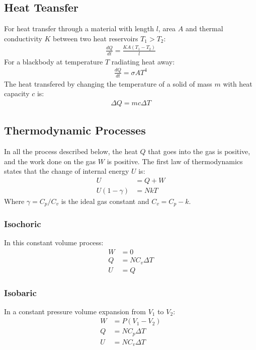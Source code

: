 \documentclass[11pt]{article}
\begin{document}
\begin{multicols*}{3}
\subsection{Heat Teansfer}
For heat transfer through a material with length $l$, area $A$ and thermal conductivity $K$ between two heat reservoirs $T_1 > T_2$:
\begin{align*}
  \frac{dQ}{dt} = \frac{KA (T_1 - T_2)}{l}
\end{align*}
For a blackbody at temperature $T$ radiating heat away:
\begin{align*}
  \frac{dQ}{dt} = \sigma A T^4
\end{align*}
The heat transfered by changing the temperature of a solid of mass $m$ with heat capacity $c$ is:
\begin{align*}
  \Delta Q = mc \Delta T
\end{align*}

\subsection{Thermodynamic Processes}
In all the process described below, the heat $Q$ that goes into the gas is positive, and the work done on the gas $W$ is positive. The first law of thermodynamics states that the change of internal energy $U$ is:
\begin{align*}
  U &= Q + W \\
  U (1- \gamma)  &= NkT
\end{align*}
Where $\gamma = C_p/C_v$ is the ideal gas constant and $C_v = C_p - k$.
\subsubsection{Isochoric}
In this constant volume process:
\begin{align*}
  W &= 0 \\
  Q &= N C_v \Delta T \\
  U &= Q
\end{align*}

\subsubsection{Isobaric}
In a constant pressure volume expansion from $V_1$ to $V_2$:
\begin{align*}
  W &= P(V_1 - V_2) \\
  Q &= N C_p \Delta T \\
  U &= N C_v \Delta T
\end{align*}


\end{multicols*}
\end{document}

